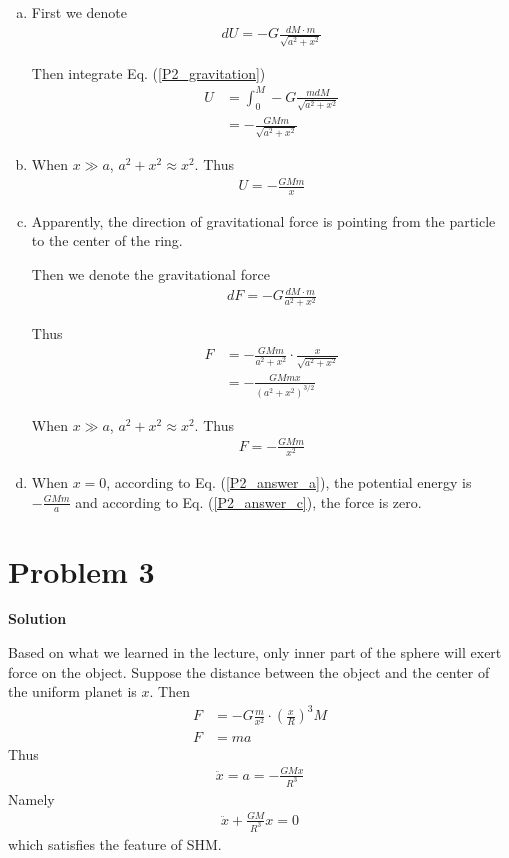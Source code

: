 \documentclass[12pt,a4paper]{article}
\begin{document}
\begin{enumerate}[(a)]
\item First we denote
	\begin{align}
		dU = - G\frac{dM \cdot m}{\sqrt{a^2+x^2}}
		\label{P2_gravitation}
	\end{align}
	
	Then integrate Eq. (\ref{P2_gravitation})
	\begin{align}
		U &= \int_0^M -G\frac{m dM}{\sqrt{a^2+x^2}} \nonumber\\
		&= -\frac{GMm}{\sqrt{a^2+x^2}}
		\label{P2_answer_a}
	\end{align}

\item When $x \gg a$, $a^2+x^2 \approx x^2$. Thus
\begin{align}
	U = -\frac{GMm}{x}
	\label{P2_answer_b}
\end{align}

\item Apparently, the direction of gravitational force is pointing from the particle to the center of the ring.

Then we denote the gravitational force
\begin{align}
	dF = -G\frac{dM \cdot m}{a^2+x^2}
\end{align}

Thus
\begin{align}
	F &= -\frac{GMm}{a^2+x^2} \cdot \frac{x}{\sqrt{a^2+x^2}} \nonumber\\
	&= -\frac{GMmx}{(a^2+x^2)^{3/2}}
	\label{P2_answer_c}
\end{align}

When $x \gg a$, $a^2+x^2 \approx x^2$. Thus
\begin{align}
	F = -\frac{GMm}{x^2}
\end{align}

\item When $x=0$, according to Eq. (\ref{P2_answer_a}), the potential energy is $-\frac{GMm}{a}$ and according to Eq. (\ref{P2_answer_c}), the force is zero.
\end{enumerate}

\section*{\large \textbf{Problem 3}}

{\textbf{Solution}}


Based on what we learned in the lecture, only inner part of the sphere will exert force on the object. Suppose the distance between the object and the center of the uniform planet is $x$. Then
\begin{align}
	F &= -G\frac{m}{x^2} \cdot \left( \frac{x}{R} \right)^3M\\
	F &= ma
\end{align}
Thus
\begin{align}
	\ddot{x} = a = -\frac{GMx}{R^3}
\end{align}
Namely
\begin{align}
	\ddot{x} + 	\frac{GM}{R^3}x = 0
	\label{SHM}
\end{align}
which satisfies the feature of SHM.
\end{document}
